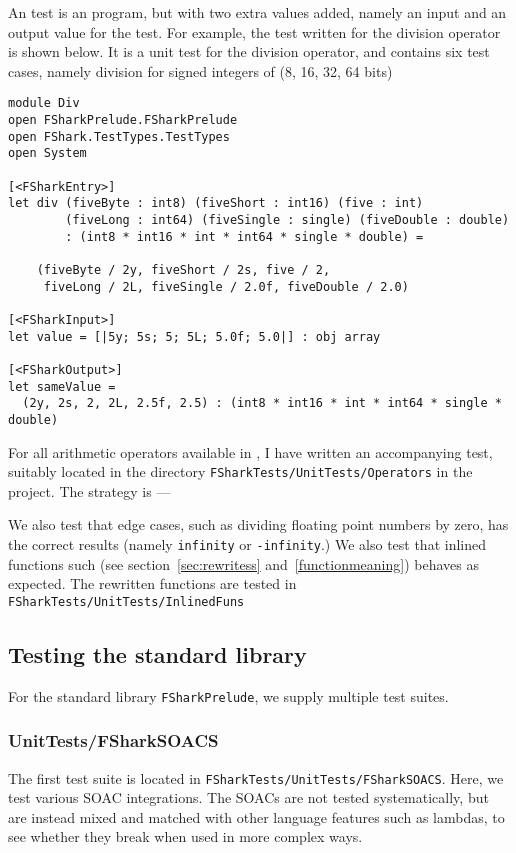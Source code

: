 An \fshark{} test is an \fshark{} program, but with two extra values added,
namely an input and an output value for the test. For example, the test written for the
division operator is shown below. It is a unit test for the division operator,
and contains six test cases, namely division for signed integers of (8, 16, 32, 64 bits)
\begin{verbatim}
module Div
open FSharkPrelude.FSharkPrelude
open FShark.TestTypes.TestTypes
open System

[<FSharkEntry>]
let div (fiveByte : int8) (fiveShort : int16) (five : int) 
        (fiveLong : int64) (fiveSingle : single) (fiveDouble : double) 
        : (int8 * int16 * int * int64 * single * double) =

    (fiveByte / 2y, fiveShort / 2s, five / 2, 
     fiveLong / 2L, fiveSingle / 2.0f, fiveDouble / 2.0)

[<FSharkInput>]
let value = [|5y; 5s; 5; 5L; 5.0f; 5.0|] : obj array

[<FSharkOutput>]
let sameValue = 
  (2y, 2s, 2, 2L, 2.5f, 2.5) : (int8 * int16 * int * int64 * single * double)
\end{verbatim}
For all arithmetic operators available in \fshark{}, I have written an
accompanying test, suitably located in the directory
\texttt{FSharkTests/UnitTests/Operators} in the \fshark{} project.
The strategy is ---

We also test that edge cases, such as dividing floating point numbers by zero,
has the correct results (namely \texttt{infinity} or \texttt{-infinity}.)
We also test that \fshark{} inlined functions such (see
section~\ref{sec:rewritess} and~\ref{functionmeaning}) behaves as expected.
The rewritten functions are tested in \texttt{FSharkTests/UnitTests/InlinedFuns}


\subsection{Testing the \fshark{} standard library}
For the \fshark{} standard library \texttt{FSharkPrelude}, we supply multiple
test suites.
\subsubsection{UnitTests/FSharkSOACS}
The first test suite is located in \texttt{FSharkTests/UnitTests/FSharkSOACS}.
Here, we test various SOAC integrations. The SOACs are not tested
systematically, but are instead mixed and matched with other \fshark{} language
features such as lambdas, to see whether they break when used in more complex ways.  

